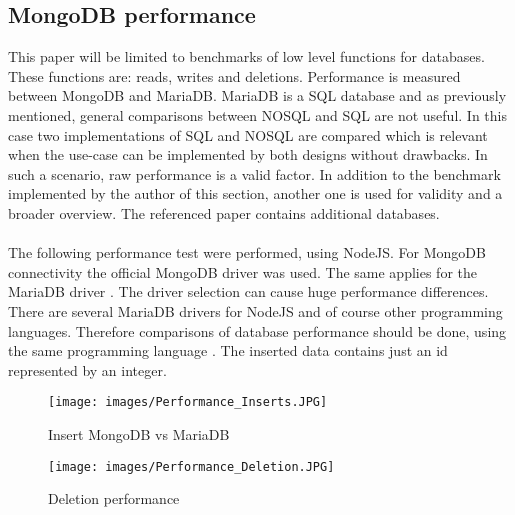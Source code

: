 \subsection{MongoDB performance}
This paper will be limited to benchmarks of low level functions for databases. These functions are: reads, writes and deletions. Performance is measured between MongoDB and MariaDB. MariaDB is a SQL database and as previously mentioned, general comparisons between NOSQL and SQL are not useful. In this case two implementations of SQL and NOSQL are compared which is relevant when the use-case can be implemented by both designs without drawbacks. In such a scenario, raw performance is a valid factor.
In addition to the benchmark implemented by the author of this section, another one is used for validity and a broader overview. The referenced paper contains additional databases.
\\\\
The following performance test were performed, using NodeJS. For MongoDB connectivity the official MongoDB driver  was used. The same applies for the MariaDB driver . The driver selection can cause huge performance differences. There are several MariaDB drivers for NodeJS and of course other programming languages. Therefore comparisons of database performance should be done, using the same programming language \cite{_mscdex.}. The inserted data contains just an id represented by an integer.
\begin{figure}[H]
\texttt{[image: images/Performance\_Inserts.JPG]}
\caption{Insert MongoDB vs MariaDB}
\end{figure}
\begin{figure}[H]
\texttt{[image: images/Performance\_Deletion.JPG]}
\caption{Deletion performance}
\label{arch-example4}
\end{figure}


